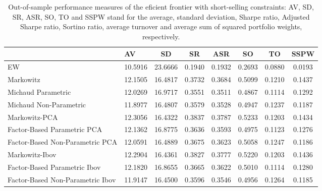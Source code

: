\begin{table}

\caption{\label{tab:empirical_ef_2}Out-of-sample performance measures of the eficient frontier with short-selling constraints: AV, SD, SR, ASR, SO, TO and SSPW stand for the average, standard deviation, Sharpe ratio, Adjusted Sharpe ratio, Sortino ratio, average turnover and average sum of squared portfolio weights, respectively.}
\centering
\begin{tabular}[t]{l|l|c|c|c|c|c|c}
\hline
  & AV & SD & SR & ASR & SO & TO & SSPW\\
\hline
EW & 10.5916 & 23.6666 & 0.1940 & 0.1932 & 0.2693 & 0.0880 & 0.0193\\
\hline
Markowitz & 12.1505 & 16.4817 & 0.3732 & 0.3684 & 0.5099 & 0.1210 & 0.1437\\
\hline
Michaud Parametric & 12.0269 & 16.9717 & 0.3551 & 0.3511 & 0.4867 & 0.1114 & 0.1292\\
\hline
Michaud Non-Parametric & 11.8977 & 16.4807 & 0.3579 & 0.3528 & 0.4947 & 0.1237 & 0.1187\\
\hline
Markowitz-PCA & 12.3056 & 16.4322 & 0.3837 & 0.3787 & 0.5233 & 0.1203 & 0.1434\\
\hline
Factor-Based Parametric PCA & 12.1362 & 16.8775 & 0.3636 & 0.3593 & 0.4975 & 0.1123 & 0.1276\\
\hline
Factor-Based Non-Parametric PCA & 12.0591 & 16.4889 & 0.3675 & 0.3623 & 0.5058 & 0.1247 & 0.1186\\
\hline
Markowitz-Ibov & 12.2904 & 16.4361 & 0.3827 & 0.3777 & 0.5220 & 0.1203 & 0.1436\\
\hline
Factor-Based Parametric Ibov & 12.1820 & 16.8655 & 0.3665 & 0.3622 & 0.5010 & 0.1114 & 0.1280\\
\hline
Factor-Based Non-Parametric Ibov & 11.9147 & 16.4500 & 0.3596 & 0.3546 & 0.4956 & 0.1264 & 0.1185\\
\hline
\end{tabular}
\end{table}
